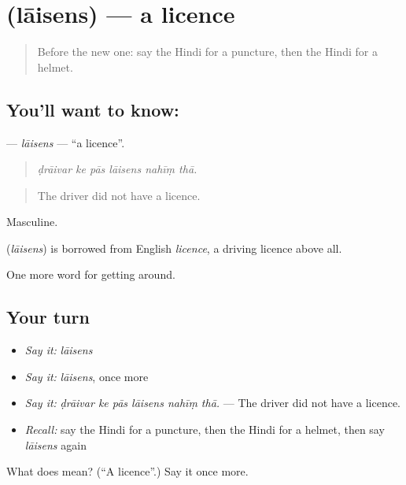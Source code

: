 \section[\texorpdfstring{\hi{लाइसेंस} (lāisens)}{लाइसेंस (lāisens)}]{ (lāisens) — a licence}

\label{lesson:HI-C406-laisens}



\begin{quote}
Before the new one: say the Hindi for a puncture, then the Hindi for a helmet.
\end{quote}

\subsection*{You'll want to know: }
\textbf{} — \emph{lāisens} — \textquotedblleft{}a licence\textquotedblright{}.

\begin{quote}
     
\end{quote}

\begin{quote}
\emph{ḍrāivar ke pās lāisens nahīṃ thā.}
\end{quote}

\begin{quote}
The driver did not have a licence.
\end{quote}

Masculine.

\begin{cousinweb}
\textbf{} (\emph{lāisens}) is borrowed from English \emph{licence}, a driving licence above all.
\end{cousinweb}

\begin{grammarlens}[title={What you've built}]
One more word for getting around.
\end{grammarlens}

\subsection*{Your turn}
\begin{itemize}
\raggedright
  \item \emph{Say it:} \emph{lāisens}
  \item \emph{Say it:} \emph{lāisens}, once more
  \item \emph{Say it:} \emph{ḍrāivar ke pās lāisens nahīṃ thā.} — The driver did not have a licence.
  \item \emph{Recall:} say the Hindi for a puncture, then the Hindi for a helmet, then say \emph{lāisens} again
\end{itemize}

\begin{tcolorbox}[breakable,colback=teal!4,colframe=teal!35!black,title={Before you move on}]
What does  mean? (\textquotedblleft{}A licence\textquotedblright{}.) Say it once more.
\end{tcolorbox}
